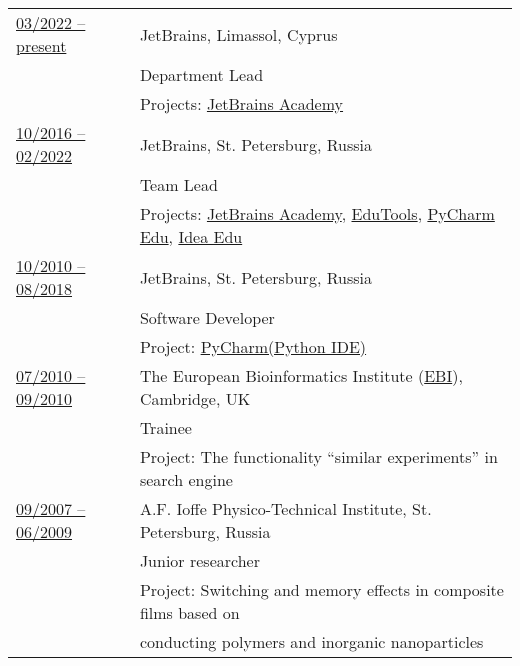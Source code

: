 \documentclass[letterpaper,11pt,oneside]{article}
\begin{document}
\noindent \begin{tabular}{@{} l l}
 \underline{03/2022 -- present}   &  JetBrains, Limassol, Cyprus  \\
                                  &  Department Lead \\
                                  &  Projects: \href{https://www.jetbrains.com/academy/}{JetBrains Academy} \vspace{1em} \\

 \underline{10/2016 -- 02/2022}   &  JetBrains, St. Petersburg, Russia  \\
                                  &  Team Lead \\
                                  &  Projects: \href{https://www.jetbrains.com/academy/}{JetBrains Academy},
                                  \href{https://plugins.jetbrains.com/plugin/10081-edutools}{EduTools},
                                  \href{https://www.jetbrains.com/pycharm-edu/}{PyCharm Edu},
                                  \href{https://www.jetbrains.com/idea-edu/}{Idea Edu} \vspace{1em} \\

\underline{10/2010 -- 08/2018}    & JetBrains, St. Petersburg, Russia \\
                          			   & Software Developer  \\
                        	 		     & Project: \href{https://www.jetbrains.com/pycharm/}{PyCharm(Python IDE)} \vspace{1em} \\
                        	 		     
\underline{07/2010 -- 09/2010}    & The European Bioinformatics Institute (\href{https://www.ebi.ac.uk/}{EBI}), Cambridge, UK \\
                          		  	   & Trainee \\
                    		           & Project: The functionality “similar experiments” in search engine \vspace{1em} \\

\underline{09/2007 -- 06/2009}    & A.F. Ioffe Physico-Technical Institute, St. Petersburg, Russia \\
                                  & Junior researcher \\
                          			   & Project: Switching and memory effects in composite films based on \\ 
                          			   & conducting polymers and inorganic nanoparticles \vspace{1em} \\


\end{tabular}
\end{document}
